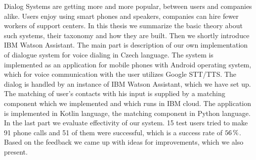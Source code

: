\documentclass[12pt]{report}
\begin{document}

Dialog Systems are getting more and more popular, between users and companies alike.
Users enjoy using smart phones and speakers, companies can hire fewer workers of
support centers. In this thesis we summarize the basic theory about such systems,
their taxonomy and how they are built. Then we shortly introduce IBM Watson Assistant.
The main part is description of our own implementation of dialogue system for voice
dialing in Czech language. The system is implemented as an application for mobile
phones with Android operating system, which for voice communication with the user
utilizes Google STT/TTS. The dialog is handled by an instance of IBM Watson Assistant,
which we have set up. The matching of user's contacts with his input is supplied
by a matching component which we implemented and which runs in IBM cloud. The application
is implemented in Kotlin language, the matching component in Python language.
In the last part we evaluate effectivity of our system. 15 test users tried to make
91 phone calls and 51 of them were successful,
which is a success rate of \(56\,\rm \%\). Based on the feedback we came up
with ideas for improvements, which we also present.
\end{document}
